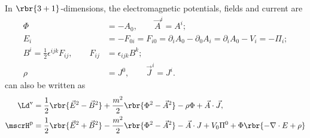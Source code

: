 \documentclass[a4paper,11pt]{article}
\begin{document}
In $\rbr{3+1}$-dimensions, the electromagnetic potentials, fields and current 
are
\begin{align}
\Phi &= -A_0,\qquad \vec A^i = A^i;
\\
E_i &= -F_{0i} = F_{i0} =
\partial_i A_0 - \partial_0 A_i = \partial_i A_0 - V_i = -\Pi_i;
\\
B^i = \frac{1}{2} \epsilon^{ijk} F_{ij},\qquad
F_{ij} &= \epsilon_{ijk}B^k;
\\
\rho &= J^0, \qquad \vec J^i = J^i.
\end{align}
 can also 
be written as
\begin{align}
\Ld^\text{v} &= \frac{1}{2} \rbr{\vec E^2 - \vec B^2}
+ \frac{m^2}{2} \rbr{\Phi^2 - \vec A^2} - \rho\Phi + \vec A\cdot\vec J,
\\
\mscrH^\text{p} &= \frac{1}{2}\rbr{\vec E^2+\vec B^2}
- \frac{m^2}{2} \rbr{\Phi^2-\vec A^2} - \vec A\cdot J
+ V_0 \Pi^0 + \Phi\rbr{-\nabla\cdot E + \rho}
\end{align}
\end{document}
